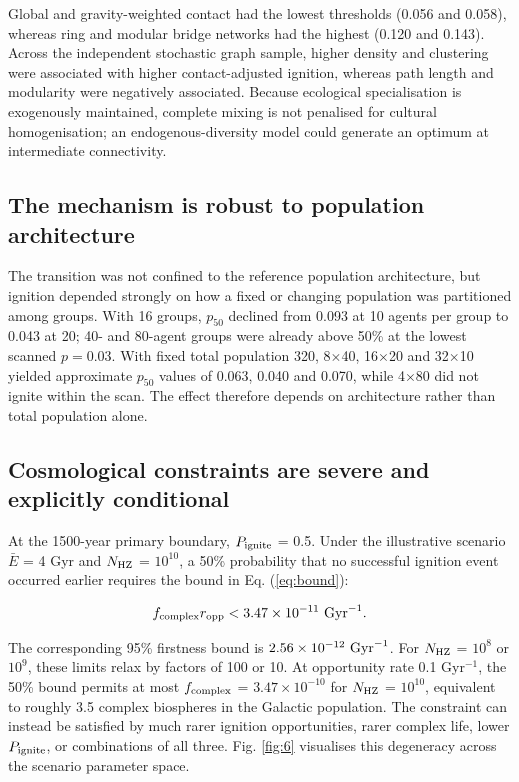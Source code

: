 \documentclass{article_saj}
\begin{document}
Global and gravity-weighted contact had the lowest thresholds (0.056 and 0.058), whereas ring and modular bridge networks had the highest (0.120 and 0.143). Across the independent stochastic graph sample, higher density and clustering were associated with higher contact-adjusted ignition, whereas path length and modularity were negatively associated. Because ecological specialisation is exogenously maintained, complete mixing is not penalised for cultural homogenisation; an endogenous-diversity model could generate an optimum at intermediate connectivity.

\subsection{The mechanism is robust to population architecture}

The transition was not confined to the reference population architecture, but ignition depended strongly on how a fixed or changing population was partitioned among groups. With 16 groups, \(p_{50}\) declined from 0.093 at 10 agents per group to 0.043 at 20; 40- and 80-agent groups were already above 50\% at the lowest scanned $p=0.03$. With fixed total population 320, 8$\times$40, 16$\times$20 and 32$\times$10 yielded approximate \(p_{50}\) values of 0.063, 0.040 and 0.070, while 4$\times$80 did not ignite within the scan. The effect therefore depends on architecture rather than total population alone.

\subsection{Cosmological constraints are severe and explicitly conditional}

At the 1500-year primary boundary, \(P_{\rm ignite}\) = 0.5. Under the illustrative scenario \(\bar{E}\) = 4 Gyr and \(N_{\rm HZ}\) = \(10^{10}\), a 50\% probability that no successful ignition event occurred earlier requires the bound in Eq. (\ref{eq:bound}):

\begin{equation}
f_{\rm complex}r_{\rm opp}<3.47\times10^{-11}\ {\rm Gyr}^{-1}.
\label{eq:bound}
\end{equation}

The corresponding 95\% firstness bound is $2.56\times10^{-12}\ {\rm Gyr}^{-1}$. For \(N_{\rm HZ}\) = \(10^8\) or \(10^9\), these limits relax by factors of 100 or 10. At opportunity rate 0.1 Gyr$^{-1}$, the 50\% bound permits at most \(f_{\rm complex}\) = $3.47\times10^{-10}$ for \(N_{\rm HZ}\) = \(10^{10}\), equivalent to roughly 3.5 complex biospheres in the Galactic population. The constraint can instead be satisfied by much rarer ignition opportunities, rarer complex life, lower \(P_{\rm ignite}\), or combinations of all three. Fig. \ref{fig:6} visualises this degeneracy across the scenario parameter space.
\end{document}
